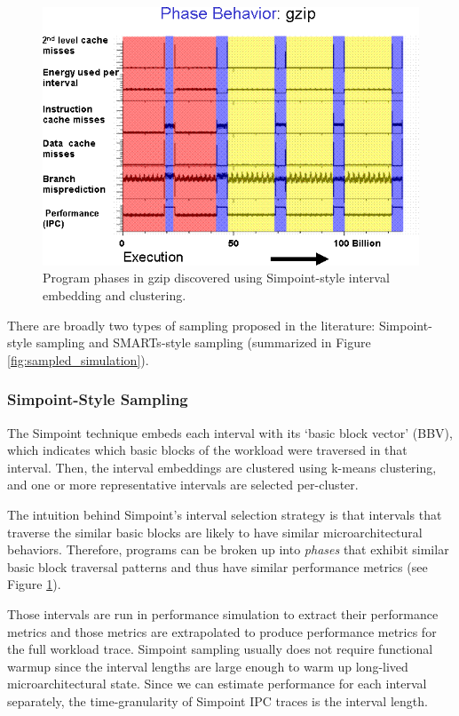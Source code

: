 \documentclass[sigplan,nonacm,10pt]{acmart}
\begin{document}
\begin{figure}
  \includegraphics[width=\linewidth]{multi-level-sim/simpoint-gzip_phases.png}
  \caption{Program phases in gzip discovered using Simpoint-style interval embedding and clustering\cite{simpoint3}.}
  \label{fig:simpoint}
\end{figure}

There are broadly two types of sampling proposed in the literature: Simpoint-style sampling\cite{simpoint3} and SMARTs-style sampling\cite{smarts} (summarized in Figure \ref{fig:sampled_simulation}).

\subsubsection{Simpoint-Style Sampling}

The Simpoint technique embeds each interval with its `basic block vector' (BBV), which indicates which basic blocks of the workload were traversed in that interval.
Then, the interval embeddings are clustered using k-means clustering, and one or more representative intervals are selected per-cluster.

The intuition behind Simpoint's interval selection strategy is that intervals that traverse the similar basic blocks are likely to have similar microarchitectural behaviors.
Therefore, programs can be broken up into \textit{phases} that exhibit similar basic block traversal patterns and thus have similar performance metrics (see Figure \ref{fig:simpoint}).

Those intervals are run in performance simulation to extract their performance metrics and those metrics are extrapolated to produce performance metrics for the full workload trace.
Simpoint sampling usually does not require functional warmup since the interval lengths are large enough to warm up long-lived microarchitectural state.
Since we can estimate performance for each interval separately, the time-granularity of Simpoint IPC traces is the interval length.
\end{document}
